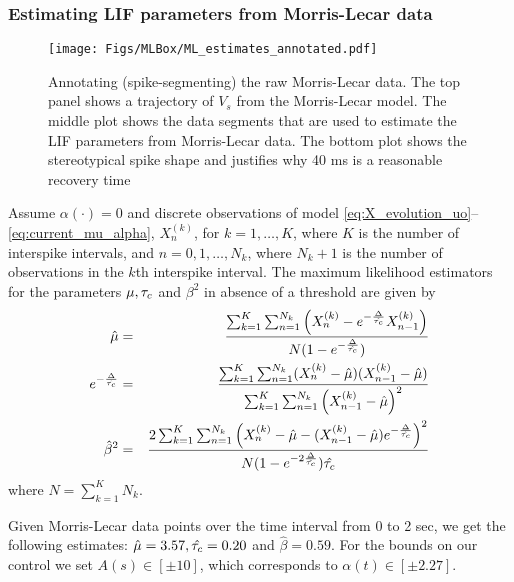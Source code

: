 \subsubsection{Estimating LIF parameters from Morris-Lecar data }
\label{sec:estimaing_LIF_from_ML}


\begin{figure}
\begin{center}
  \texttt{[image: Figs/MLBox/ML\_estimates\_annotated.pdf]} 
  \caption[labelInTOC]{Annotating (spike-segmenting) the raw Morris-Lecar data. 
  The top panel shows a trajectory of $V_s$ from the Morris-Lecar model. 
  The middle plot shows the data segments that are used to estimate the LIF
  parameters from Morris-Lecar data. 
  The bottom plot shows the stereotypical spike shape and justifies why 40 ms
  is a reasonable recovery time}
  \label{fig:ML_estimates_data} 
\end{center}
\end{figure} 
Assume $\alpha(\cdot)=0$ and discrete observations of model \eqref{eq:X_evolution_uo}--\eqref{eq:current_mu_alpha}, $X_n^{(k)}$, for $k=1,\ldots ,
K$, where $K$ is the number of interspike intervals, and $n=0,1, \ldots
, N_k$, where $N_k+1$ is the number of observations in the $k$th
interspike interval. 
The maximum likelihood estimators for the parameters $\mu, \tau_c$ and
$\beta^2$ in absence of a threshold are given by 
\begin{eqnarray*} 
\hat{ \mu} &=& 
\frac{ \sum_{k=1}^K \sum_{n=1}^{N_k} \left( X^{(k)}_n - e^{-\frac{\Delta} {\hat {\tau_c}}} X^{(k)}_{n-1} \right)} 
	 { N( 1-e^{-\frac {\Delta} {\hat {\tau_c}}})}
\\
e^{-\frac {\Delta}{\hat{\tau_c}} } &=& 
\frac { \sum_{k=1}^K \sum_{n=1}^{N_k} ( X^{(k)}_n - \hat \mu)(X^{(k)}_{n-1} - \hat \mu) }
						  { \sum_{k=1}^K \sum_{n=1}^{N_k} \left( X^{(k)}_{n-1} - \hat \mu \right)^2 } 
\\
\hat\beta^2 &=&  
\frac{ 2\sum_{k=1}^K \sum_{n=1}^{N_k}  \left( X^{(k)}_n - \hat \mu - (X^{(k)}_{n-1} -
\hat \mu) e^{-\frac {\Delta} {\hat {\tau_c}}} \right)^2 } 
	  { N (1-e^{-2\frac {\Delta} {\hat {\tau_c}}}) \hat {\tau_c}}
\end{eqnarray*}
where $N= \sum_{k=1}^K N_k$.

Given Morris-Lecar data points over the time interval from 0 to 2 sec, we get
the following estimates: $\hat \mu = 3.57, \hat {\tau_c} = 0.20$ and $\hat \beta = 0.59$. For the bounds on our 
control we set $A(s) \in [\pm 10]$, which corresponds to $\alpha(t)
\in [\pm 2.27]$.

